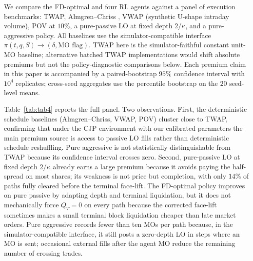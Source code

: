 \documentclass[]{interact}
\theoremstyle{plain}
\theoremstyle{definition}
\theoremstyle{remark}
\newcommand{\1}[1]{\mathbf{1}_{\{#1\}}}
\begin{document}
We compare the FD-optimal and four RL agents against a panel of execution benchmarks: TWAP, Almgren--Chriss \citep{almgrenchriss2001}, VWAP (synthetic U-shape intraday volume), POV at $10\%$, a pure-passive LO at fixed depth $2/\kappa$, and a pure-aggressive policy. All baselines use the simulator-compatible interface $\pi(t, q, S) \to (\delta, \text{MO flag})$. TWAP here is the simulator-faithful constant unit-MO baseline; alternative batched TWAP implementations would shift absolute premiums but not the policy-diagnostic comparisons below. Each premium claim in this paper is accompanied by a paired-bootstrap $95\%$ confidence interval with $10^4$ replicates; cross-seed aggregates use the percentile bootstrap on the $20$ seed-level means.

Table~\ref{tab:tab4} reports the full panel. Two observations. First, the deterministic schedule baselines (Almgren--Chriss, VWAP, POV) cluster close to TWAP, confirming that under the CJP environment with our calibrated parameters the main premium source is access to passive LO fills rather than deterministic schedule reshuffling. Pure aggressive is not statistically distinguishable from TWAP because its confidence interval crosses zero. Second, pure-passive LO at fixed depth $2/\kappa$ already earns a large premium because it avoids paying the half-spread on most shares; its weakness is not price but completion, with only $14\%$ of paths fully cleared before the terminal face-lift. The FD-optimal policy improves on pure passive by adapting depth and terminal liquidation, but it does not mechanically force $Q_T=0$ on every path because the corrected face-lift sometimes makes a small terminal block liquidation cheaper than late market orders. Pure aggressive records fewer than ten MOs per path because, in the simulator-compatible interface, it still posts a zero-depth LO in steps where an MO is sent; occasional external fills after the agent MO reduce the remaining number of crossing trades.
\end{document}
